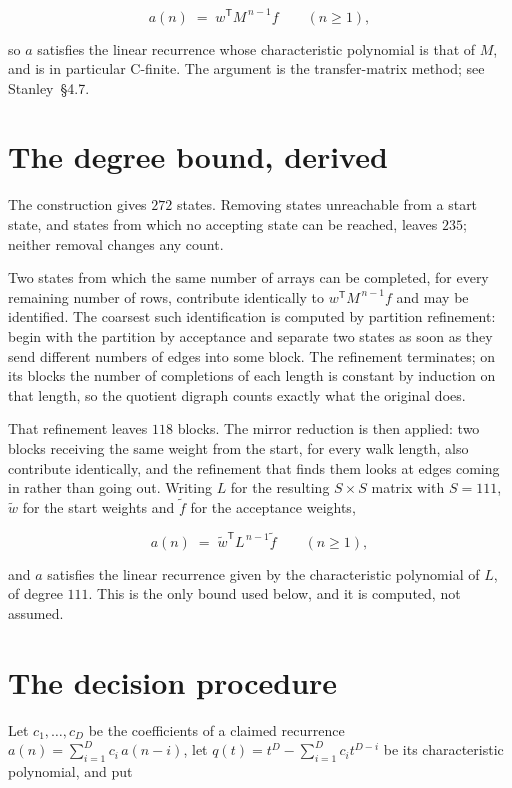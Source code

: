 \documentclass[11pt]{article}
\theoremstyle{definition}
\begin{document}
\[a(n) \;=\; w^{\mathsf T} M^{\,n-1} f \qquad (n \ge 1),\]

so $a$ satisfies the linear recurrence whose characteristic polynomial is that of $M$, and is in particular C-finite. The argument is the transfer-matrix method; see Stanley~\S4.7.

\section{The degree bound, derived}

The construction gives $272$ states. Removing states unreachable from a start state, and states from which no accepting state can be reached, leaves $235$; neither removal changes any count.

Two states from which the same number of arrays can be completed, for every remaining number of rows, contribute identically to $w^{\mathsf T}M^{\,n-1}f$ and may be identified. The coarsest such identification is computed by partition refinement: begin with the partition by acceptance and separate two states as soon as they send different numbers of edges into some block. The refinement terminates; on its blocks the number of completions of each length is constant by induction on that length, so the quotient digraph counts exactly what the original does.

That refinement leaves $118$ blocks. The mirror reduction is then applied: two blocks receiving the same weight from the start, for every walk length, also contribute identically, and the refinement that finds them looks at edges coming in rather than going out. Writing $L$ for the resulting $S \times S$ matrix with $S = 111$, $\tilde w$ for the start weights and $\tilde f$ for the acceptance weights,

\[a(n) \;=\; \tilde w^{\mathsf T} L^{\,n-1} \tilde f \qquad (n \ge 1),\]

and $a$ satisfies the linear recurrence given by the characteristic polynomial of $L$, of degree $111$. This is the only bound used below, and it is computed, not assumed.

\section{The decision procedure}

Let $c_1,\dots,c_D$ be the coefficients of a claimed recurrence $a(n) = \sum_{i=1}^{D} c_i\,a(n-i)$, let $q(t) = t^{D} - \sum_{i=1}^{D} c_i t^{D-i}$ be its characteristic polynomial, and put
\end{document}
